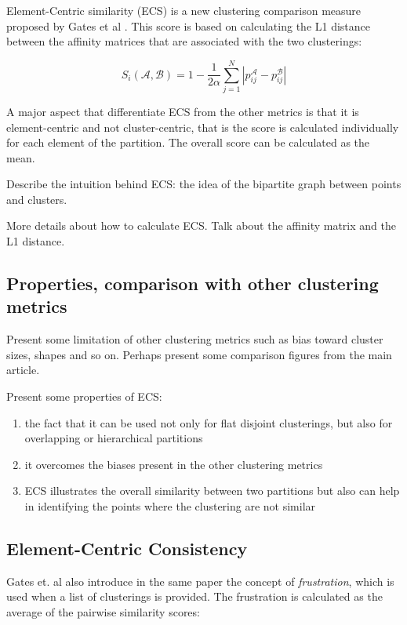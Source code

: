     Element-Centric similarity (ECS) is a new clustering comparison measure proposed by Gates et al \cite{Gates2019}. This score is based on calculating the L1 distance between the affinity matrices that are associated with the two clusterings:

    \begin{equation} \label{eq:def-ecs}
        S_i (\mathcal{A}, \mathcal{B}) = 1 - \frac{1}{2 \alpha} \sum_{j = 1}^N |p_{ij}^{\mathcal{A}} - p_{ij}^{\mathcal{B}} | 
    \end{equation}

    A major aspect that differentiate ECS from the other metrics is that it is element-centric and not cluster-centric, that is the score is calculated individually for each element of the partition. The overall score can be calculated as the mean.

    Describe the intuition behind ECS: the idea of the bipartite graph between points and clusters.

    More details about how to calculate ECS. Talk about the affinity matrix and the L1 distance.
    \subsection{Properties, comparison with other clustering metrics}
    Present some limitation of other clustering metrics such as bias toward cluster sizes, shapes and so on. Perhaps present some comparison figures from the main article.

    Present some properties of ECS:
    \begin{enumerate}
        \item the fact that it can be used not only for flat disjoint clusterings, but also for overlapping or hierarchical partitions
        \item it overcomes the biases present in the other clustering metrics
        \item ECS illustrates the overall similarity between two partitions but also can help in identifying the points where the clustering are not similar
    \end{enumerate}
    \subsection{Element-Centric Consistency}
    Gates et. al also introduce in the same paper the concept of \textit{frustration}, which is used when a list of clusterings is provided. The frustration is calculated as the average of the pairwise similarity scores:

